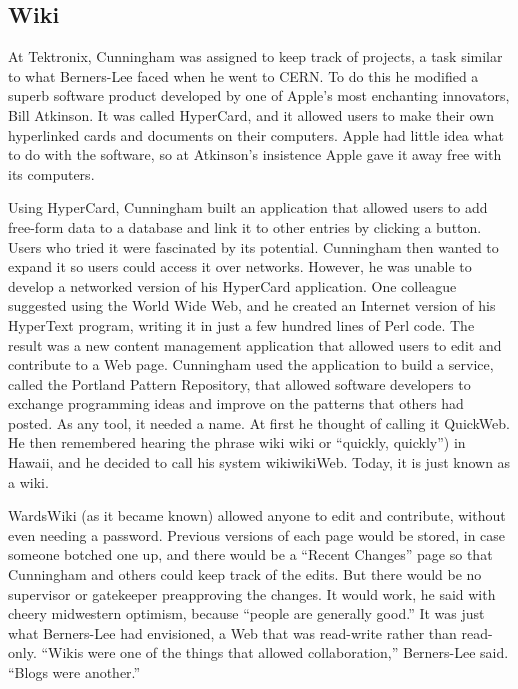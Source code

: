 \documentclass[11pt]{article}
\begin{document}
\subsection{Wiki}
\par 
At Tektronix, Cunningham was assigned to keep track of projects, a task similar to what Berners-Lee faced when he went to CERN. To do this he modified a superb software product developed by one of Apple’s most enchanting innovators, Bill Atkinson. It was called HyperCard, and it allowed users to make their own hyperlinked cards and documents on their computers. Apple had little idea what to do with the software, so at Atkinson’s insistence Apple gave it away free with its computers.\cite{innovators}
\par
Using  HyperCard,  Cunningham  built  an  application  that allowed  users  to  add  free-form  data  to  a  database  and  link it  to  other  entries  by  clicking  a  button.  Users  who  tried  it were fascinated by its potential. Cunningham then wanted to  expand  it  so  users  could  access  it  over  networks.\cite{cs-encyclopedia}  However,  he  was  unable  to  develop  a  networked  version  of  his HyperCard application. One colleague suggested using the World Wide Web, and he created an Internet version of his HyperText program, writing it in just a few hundred lines of Perl code. The result was a new content management application that allowed users to edit and contribute to a Web page. Cunningham used the application to build a service, called the Portland Pattern Repository, that allowed software developers to exchange programming ideas and improve on the patterns that others had posted.\cite{innovators} As any tool, it needed a name. At first he thought of calling it QuickWeb. He  then  remembered  hearing  the  phrase wiki wiki or “quickly, quickly”) in Hawaii, and he decided to call his system wikiwikiWeb. Today, it is just known as a wiki.\cite{cs-encyclopedia}
\par 
WardsWiki (as it became known) allowed anyone to edit and contribute, without even needing a password. Previous versions of each page would be stored, in case someone botched one up, and there would be a “Recent Changes” page so that Cunningham and others could keep track of the edits. But there would be no supervisor or gatekeeper preapproving the changes. It would work, he said with cheery midwestern optimism, because “people are generally good.” It was just what Berners-Lee had envisioned, a Web that was read-write rather than read-only. “Wikis were one of the things that allowed collaboration,” Berners-Lee said. “Blogs were another.”\cite{innovators}
\end{document}

